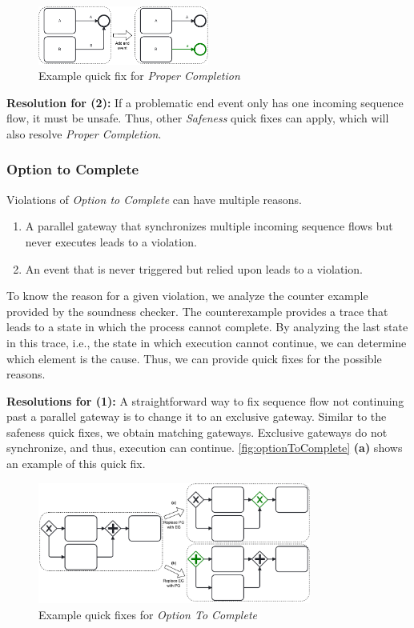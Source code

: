 \documentclass[runningheads]{llncs}
\begin{document}
\begin{figure}[ht]
	\centering
	\includegraphics[width=0.5\textwidth]{images/properCompletion}
	\caption{Example quick fix for \textit{Proper Completion}}
	\label{fig:properCompletion}
\end{figure}

\textbf{Resolution for (2):} If a problematic end event only has one incoming sequence flow, it must be unsafe.
Thus, other \textit{Safeness} quick fixes can apply, which will also resolve \textit{Proper Completion}.


\subsubsection{Option to Complete}
Violations of \textit{Option to Complete} can have multiple reasons.

\begin{enumerate}
	\item A parallel gateway that synchronizes multiple incoming sequence flows but never executes leads to a violation.
	\item An event that is never triggered but relied upon leads to a violation.
\end{enumerate}

To know the reason for a given violation, we analyze the counter example provided by the soundness checker.
The counterexample provides a trace that leads to a state in which the process cannot complete.
By analyzing the last state in this trace, i.e., the state in which execution cannot continue, we can determine which element is the cause.
Thus, we can provide quick fixes for the possible reasons.

\textbf{Resolutions for (1):} A straightforward way to fix sequence flow not continuing past a parallel gateway is to change it to an exclusive gateway.
Similar to the safeness quick fixes, we obtain matching gateways.
Exclusive gateways do not synchronize, and thus, execution can continue.
\autoref{fig:optionToComplete} \textbf{(a)} shows an example of this quick fix.

\begin{figure}[ht]
	\centering
	\includegraphics[width=0.8\textwidth]{images/optionToComplete}
	\caption{Example quick fixes for \textit{Option To Complete}}
	\label{fig:optionToComplete}
\end{figure}
\end{document}
